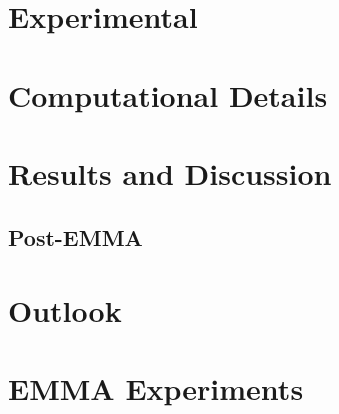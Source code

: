 \documentclass[a4paper]{article}
\begin{document}
\section{Experimental}
\label{sec:exp}
%

\section{Computational Details}
\label{sec:comp}
%

\section{Results and Discussion}
\label{sec:results}
%
%
\subsection{Post-EMMA}
%
%

\section{Outlook}
\label{sec:outlook}
%




\clearpage

\appendix
\section{EMMA Experiments}
\label{sec:app-emma}

\end{document}
